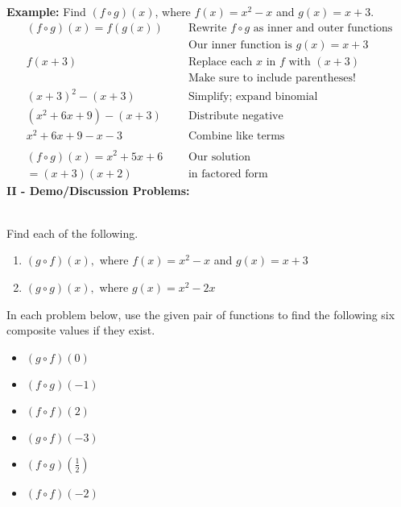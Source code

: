\documentclass[12pt]{article}
\theoremstyle{definition}
\begin{document}
{\bf Example:} Find $(f \circ g) (x)$, where $f (x) = x^2 - x$ and $g (x) = x + 3$.
  \begin{eqnarray*}
    (f \circ g) (x)=f (g (x)) &  & \text{Rewrite~} f\circ g \text{~as~inner~and~outer~functions}\\
	    &  & \text{Our~inner~function~is~} g(x) = x + 3\\
    f (x + 3) &  & \text{Replace~each~} x \text{~in~} f \text{~with~} (x + 3)\\
		  &  & \text{Make~sure~to~include~parentheses!}\\
    (x + 3)^2 - (x + 3) &  & \text{Simplify;~expand~binomial}\\
    (x^2 + 6 x + 9) - (x + 3) &  & \text{Distribute~negative}\\
    x^2 + 6 x + 9 - x - 3~~ &  & \text{Combine~like~terms}\\
	& & \\
		(f \circ g) (x)=x^2 + 5 x + 6~~~ &  & \text{Our solution}\\
		=(x+3)(x+2) & & \text{in~factored~form}
  \end{eqnarray*}
{\bf II - Demo/Discussion Problems:}\\
\ \par
Find each of the following.
\begin{enumerate}
	\item $(g\circ f)(x),$ where $f(x)=x^2-x$ and $g(x)=x+3$
	\item $(g\circ g)(x),$ where $g(x)=x^2-2x$
\end{enumerate}

In each problem below, use the given pair of functions to find the following six composite values if they exist.

\begin{multicols}{3}
\begin{itemize}
\item  $(g\circ f)(0)$
\item  $(f\circ g)(-1)$
\item  $(f \circ f)(2)$
\end{itemize}
\end{multicols}

\begin{multicols}{3}
\begin{itemize}
\item  $(g\circ f)(-3)$
\item  $(f\circ g)\left(\frac{1}{2}\right)$
\item  $(f \circ f)(-2)$
\end{itemize}
\end{multicols}
\end{document}
